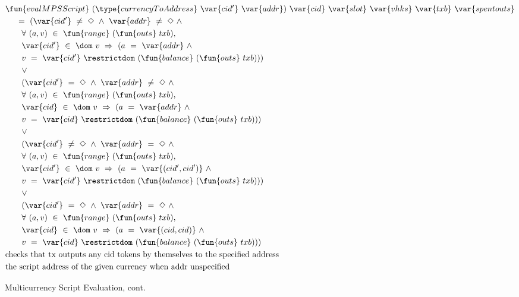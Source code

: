 \begin{figure*}[htb]
  \begin{align*}
    & \fun{evalMPSScript}
     ~(\type{currencyToAddress}~\var{cid'}~\var{addr})~\var{cid}~ \var{slot}~\var{vhks} ~\var{txb}~\var{spentouts} \\
    &~~~~ =~ (\var{cid'}~\neq~\Nothing ~\wedge ~\var{addr}~\neq~\Nothing ~\wedge \\
    &~~~~~~ \forall~(a, v)~\in~\fun{range}~(\fun{outs}~txb),~\\
    &~~~~~~ \var{cid'}~\in~\dom~v~\Rightarrow~(a~=~\var{addr} ~\wedge~ \\
    &~~~~~~ v~=~\var{cid'}~ \restrictdom~(\fun{balance}~(\fun{outs}~txb))) \\
    &~~~~~~ \vee \\
    &~~~~~~ (\var{cid'}~=~\Nothing ~\wedge~ \var{addr}~\neq~\Nothing ~\wedge \\
    &~~~~~~ \forall~(a, v)~\in~\fun{range}~(\fun{outs}~txb),~\\
    &~~~~~~ \var{cid}~\in~\dom~v~\Rightarrow~(a~=~\var{addr} ~\wedge~\\
    &~~~~~~ v~=~\var{cid}~ \restrictdom~(\fun{balance}~(\fun{outs}~txb))) \\
    &~~~~~~ \vee \\
    &~~~~~~ (\var{cid'}~\neq~\Nothing ~\wedge~ \var{addr}~=~\Nothing ~\wedge \\
    &~~~~~~ \forall~(a, v)~\in~\fun{range}~(\fun{outs}~txb),~\\
    &~~~~~~ \var{cid'}~\in~\dom~v~\Rightarrow~(a~=~\var{(cid',cid')} ~\wedge~\\
    &~~~~~~ v~=~\var{cid'}~ \restrictdom~(\fun{balance}~(\fun{outs}~txb))) \\
    &~~~~~~ \vee \\
    &~~~~~~ (\var{cid'}~=~\Nothing ~\wedge~ \var{addr}~=~\Nothing ~\wedge \\
    &~~~~~~ \forall~(a, v)~\in~\fun{range}~(\fun{outs}~txb),~\\
    &~~~~~~ \var{cid}~\in~\dom~v~\Rightarrow~(a~=~\var{(cid,cid)} ~\wedge~\\
    &~~~~~~ v~=~\var{cid}~ \restrictdom~(\fun{balance}~(\fun{outs}~txb))) \\
    & \text{checks that tx outputs any cid tokens by themselves to the specified address} \\
    & \text {the script address of the given currency when addr unspecified}
    \end{align*}
    \caption{Multicurrency Script Evaluation, cont.}
    \label{fig:defs:tx-mc-eval-2}
\end{figure*}

